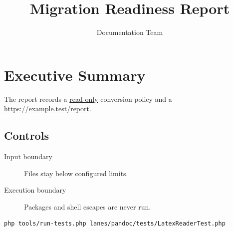 \documentclass{report}
\title{Migration Readiness Report}
\author{Documentation Team}
\begin{document}
\maketitle
\chapter{Executive Summary}\label{chap:summary}
The report records a \underline{read-only} conversion policy and a
\url{https://example.test/report}.

\section{Controls}
\begin{description}
  \item[Input boundary] Files stay below configured limits.
  \item[Execution boundary] Packages and shell escapes are never run.
\end{description}

\begin{verbatim}
php tools/run-tests.php lanes/pandoc/tests/LatexReaderTest.php
\end{verbatim}
\end{document}

